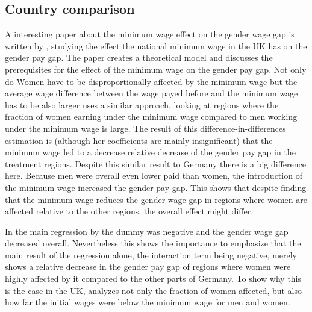 \documentclass[12pt,draft,a4paper]{article}
\begin{document}
\subsection{Country comparison}
A interesting paper about the minimum wage effect on the gender wage gap is written by \citet{Robinson05UK}, studying the effect the national minimum wage in the UK has on the gender pay gap. The paper creates a theoretical model and discusses the prerequisites for the effect of the minimum wage on the gender pay gap. 
Not only do Women have to be disproportionally affected by the minimum wage but the average wage difference between the wage payed before and the minimum wage has to be also larger
 uses a similar approach, looking at regions where the fraction of women earning under the minimum wage compared to men working under the minimum wage is large. The result of this difference-in-differences estimation is (although her coefficients are mainly insignificant) that the minimum wage led to a decrease relative decrease of the gender pay gap in the treatment regions.
Despite this similar result to Germany there is a big difference here.
Because men were overall even lower paid than women, the introduction of the minimum wage increased the gender pay gap. This shows that despite finding that the minimum wage reduces the gender wage gap in regions where women are affected relative to the other regions, the overall effect might differ.

In the main regression by \citet{CALIENDO22} the dummy was negative and the gender wage gap decreased overall. Nevertheless this shows the importance to emphasize that the main result of the regression alone, the interaction term being negative, merely shows a relative decrease in the gender pay gap of regions where women were highly affected by it compared to the other parts of Germany.
To show why this is the case in the UK,  analyzes not only the fraction of women affected, but also how far the initial wages were below the minimum wage for men and women.
\end{document}
